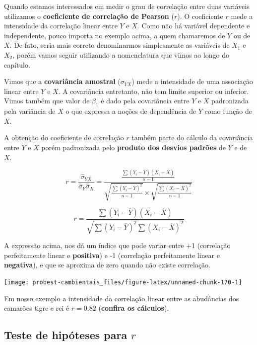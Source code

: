 \documentclass[
]{book}
\begin{document}
Quando estamos interessados em medir o grau de correlação entre duas variáveis utilizamos o \textbf{coeficiente de correlação de Pearson} (\textbf{\(r\)}). O coeficiente \(r\) mede a intensidade da correlação linear entre \(Y\) e \(X\). Como não há variável dependente e independente, pouco importa no exemplo acima, a quem chamaremos de \(Y\) ou de \(X\). De fato, seria mais correto denominarmos simplesmente as variáveis de \(X_1\) e \(X_2\), porém vamos seguir utilizando a nomenclatura que vimos ao longo do capítulo.

Vimos que a \textbf{covariância amostral} (\(\sigma_{YX}\)) mede a intensidade de uma associação linear entre \(Y\) e \(X\). A covariância entretanto, não tem limite superior ou inferior. Vimos também que valor de \(\beta_1\) é dado pela covariância entre \(Y\) e \(X\) padronizada pela variância de \(X\) o que expressa a noções de dependência de \(Y\) como função de \(X\).

A obtenção do coeficiente de correlação \(r\) também parte do cálculo da covariância entre \(Y\) e \(X\) porém padronizada pelo \textbf{produto dos desvios padrões} de \(Y\) e de \(X\).

\[r = \frac{\hat{\sigma}_{YX}}{\hat{\sigma}_Y \hat{\sigma}_X} = 
\frac{\frac{\sum{(Y_i - \overline{Y})(X_i - \overline{X})}}{n-1}}
{\sqrt{\frac{\sum{(Y_i - \overline{Y})^2}}{n-1}}  \times 
\sqrt{\frac{\sum{(X_i - \overline{X})^2}}{n-1}}}\]

\[r = \frac{\sum{(Y_i - \overline{Y})(X_i - \overline{X})}}{\sqrt{\sum{(Y_i - \overline{Y})^2 \sum{(X_i - \overline{X})^2}}}}\]

A expressão acima, nos dá um índice que pode variar entre +1 (correlação perfeitamente linear e \textbf{positiva}) e -1 (correlação perfeitamente linear e \textbf{negativa}), e que se aproxima de zero quando não existe correlação.

\begin{center}\texttt{[image: probest-cambientais\_files/figure-latex/unnamed-chunk-170-1]} \end{center}

Em nosso exemplo a intensidade da correlação linear entre as abudâncias dos camarões tigre e rei é \(r = 0.82\) (\textbf{confira os cálculos}).

\hypertarget{teste-de-hipuxf3teses-para-r}{%
\subsection{\texorpdfstring{Teste de hipóteses para \(r\)}{Teste de hipóteses para r}}\label{teste-de-hipuxf3teses-para-r}}
\end{document}
